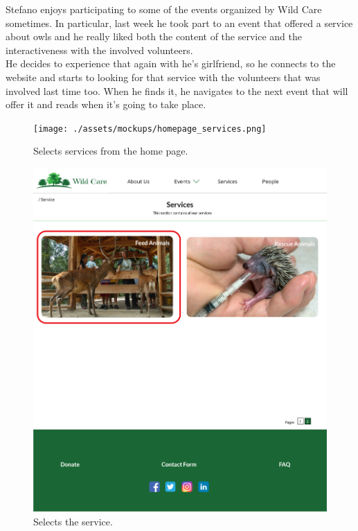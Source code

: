 Stefano enjoys participating to some of the events organized by Wild Care sometimes. In particular, last week he took part to an event that offered a service about owls and he really liked both the content of the service and the interactiveness with the involved volunteers.\\
He decides to experience that again with he's girlfriend, so he connects to the website and starts to looking for that service with the volunteers that was involved last time too. When he finds it, he navigates to the next event that will offer it and reads when it's going to take place.

	\begin{figure}[h!]
		\centering
		\begin{minipage}[b]{0.8\textwidth}
    			\texttt{[image: ./assets/mockups/homepage\_services.png]}
			\caption{Selects services from the home page.}
		\end{minipage}
	\end{figure}

	\begin{figure}[h!]
		\centering
		\begin{minipage}[b]{1\textwidth}
    			\includegraphics[width=\textwidth]{./assets/mockups/services_servicedetails.png}
			\caption{Selects the service.}
		\end{minipage}
	\end{figure}

